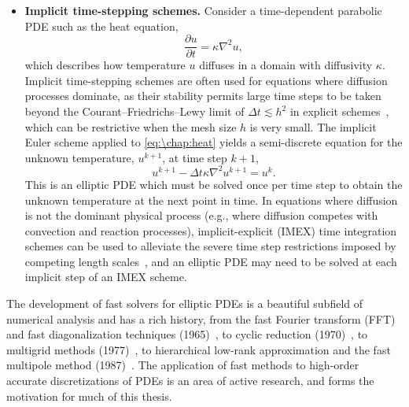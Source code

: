 \begin{itemize}
\item \textbf{Implicit time-stepping schemes.} Consider a time-dependent parabolic PDE such as the heat equation,
\begin{equation}\label{eq:\chap:heat}
\frac{\partial u}{\partial t} = \kappa \nabla^2 u,
\end{equation}
which describes how temperature $u$ diffuses in a domain with diffusivity $\kappa$. Implicit time-stepping schemes are often used for equations where diffusion processes dominate, as their stability permits large time steps to be taken beyond the Courant--Friedrichs--Lewy limit of $\Delta t \lesssim h^2$ in explicit schemes~\cite{Courant_28_01}, which can be restrictive when the mesh size $h$ is very small. The implicit Euler scheme applied to \cref{eq:\chap:heat} yields a semi-discrete equation for the unknown temperature, $u^{k+1}$, at time step $k+1$,
\[
u^{k+1} - \Delta t \kappa \nabla^2 u^{k+1} = u^k.
\]
This is an elliptic PDE which must be solved once per time step to obtain the unknown temperature at the next point in time. In equations where diffusion is not the dominant physical process (e.g., where diffusion competes with convection and reaction processes), implicit-explicit (IMEX) time integration schemes can be used to alleviate the severe time step restrictions imposed by competing length scales~\cite{Ascher_95_01,Ruuth_95_01}, and an elliptic PDE may need to be solved at each implicit step of an IMEX scheme.

\end{itemize}



The development of fast solvers for elliptic PDEs is a beautiful subfield of numerical analysis and has a rich history, from the fast Fourier transform (FFT) and fast diagonalization techniques (1965)~\cite{Cooley_65_01}, to cyclic reduction (1970)~\cite{Buzbee_70_01}, to multigrid methods (1977)~\cite{Brandt_77_01}, to hierarchical low-rank approximation and the fast multipole method (1987)~\cite{Greengard_87_01}. The application of fast methods to high-order accurate discretizations of PDEs is an area of active research, and forms the motivation for much of this thesis.

